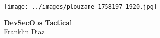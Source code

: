\begin{titlepage}
    \centering
        \vspace{0mm}
        \texttt{[image: ../images/plouzane-1758197\_1920.jpg]}
        \vspace*{40mm} %
        \begin{flushright}
            \textbf{\Huge {DevSecOps Tactical}}\\
            \vspace{5mm}
            \Large \textsf{Franklin Diaz}\\
            \vspace*{0mm}
        \end{flushright}
	\clearpage
		\vspace*{\fill}
\end{titlepage}


